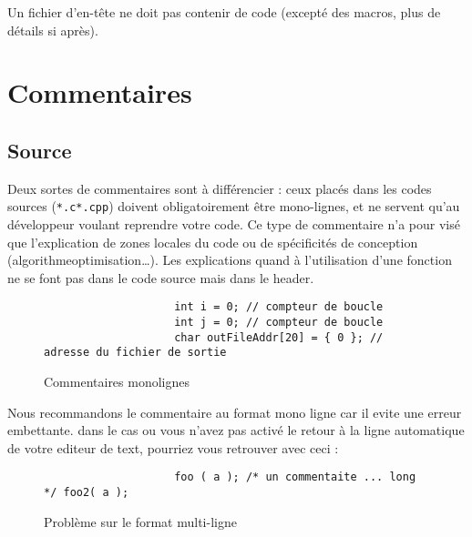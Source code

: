 			Un fichier d'en-tête ne doit pas contenir de code (excepté des macros, plus de détails si après).

	\section{Commentaires}
		\subsection{Source}
			Deux sortes de commentaires sont à différencier : ceux placés dans les codes sources (\verb+*.c+\/\verb+*.cpp+) doivent obligatoirement être mono-lignes, et ne servent qu'au développeur voulant reprendre votre code. Ce type de commentaire n'a pour visé que l'explication de zones locales du code ou de spécificités de conception (algorithme\/optimisation\/\dots). Les explications quand à l'utilisation d'une fonction ne se font pas dans le code source mais dans le header.

			\begin{figure}[H]
				\begin{changemargin}{-2.5cm}{-2.5cm}
				\begin{tcolorbox}
				\begin{verbatim}
					int i = 0; // compteur de boucle
					int j = 0; // compteur de boucle
					char outFileAddr[20] = { 0 }; // adresse du fichier de sortie
				\end{verbatim}
				\end{tcolorbox}
				\end{changemargin}
				\caption{Commentaires monolignes}
			\end{figure}

			Nous recommandons le commentaire au format mono ligne car il evite une erreur embettante. dans le cas ou vous n'avez pas activé le retour à la ligne automatique de votre editeur de text, pourriez vous retrouver avec ceci :

			\begin{figure}[H]
				\begin{changemargin}{-2.5cm}{-2.5cm}
				\begin{tcolorbox}
				\begin{verbatim}
					foo ( a ); /* un commentaite ... long */ foo2( a );
				\end{verbatim}
				\end{tcolorbox}
				\end{changemargin}
				\caption{Problème sur le format multi-ligne}
			\end{figure}

